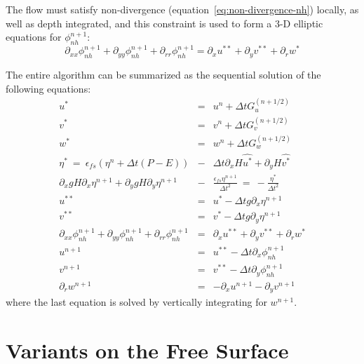 The flow must satisfy non-divergence
(equation~\ref{eq:non-divergence-nh}) locally, as well as depth
integrated, and this constraint is used to form a 3-D elliptic
equations for $\phi_{nh}^{n+1}$:
\begin{equation}
\partial_{xx} \phi_{nh}^{n+1} + \partial_{yy} \phi_{nh}^{n+1} + 
\partial_{rr} \phi_{nh}^{n+1} =
\partial_x u^{**} + \partial_y v^{**} + \partial_r w^{*}
\end{equation}

The entire algorithm can be summarized as the sequential solution of
the following equations:
\begin{eqnarray}
u^{*} & = & u^{n} + \Delta t G_u^{(n+1/2)} \label{eq:ustar-nh} \\
v^{*} & = & v^{n} + \Delta t G_v^{(n+1/2)} \label{eq:vstar-nh} \\
w^{*} & = & w^{n} + \Delta t G_w^{(n+1/2)} \label{eq:wstar-nh} \\
\eta^* ~ = ~ \epsilon_{fs} \left( \eta^{n} + \Delta t (P-E) \right)
& - & \Delta t 
  \partial_x H \widehat{u^{*}}
+ \partial_y H \widehat{v^{*}}
\\
  \partial_x g H \partial_x \eta^{n+1}
+ \partial_y g H \partial_y \eta^{n+1}
& - & \frac{\epsilon_{fs} \eta^{n+1}}{\Delta t^2}
~ = ~
- \frac{\eta^*}{\Delta t^2}
\label{eq:elliptic-nh}
\\
u^{**} & = & u^{*} - \Delta t g \partial_x \eta^{n+1} \label{eq:unx-nh}\\
v^{**} & = & v^{*} - \Delta t g \partial_y \eta^{n+1} \label{eq:vnx-nh}\\
\partial_{xx} \phi_{nh}^{n+1} + \partial_{yy} \phi_{nh}^{n+1} + 
\partial_{rr} \phi_{nh}^{n+1} & = &
\partial_x u^{**} + \partial_y v^{**} + \partial_r w^{*}  \label{eq:phi-nh}\\
u^{n+1} & = & u^{**} - \Delta t \partial_x \phi_{nh}^{n+1} \label{eq:un+1-nh}\\
v^{n+1} & = & v^{**} - \Delta t \partial_y \phi_{nh}^{n+1} \label{eq:vn+1-nh}\\
\partial_r w^{n+1} & = & - \partial_x u^{n+1} - \partial_y v^{n+1}
\end{eqnarray}
where the last equation is solved by vertically integrating for
$w^{n+1}$. 



\section{Variants on the Free Surface}
\label{sec:free-surface}

